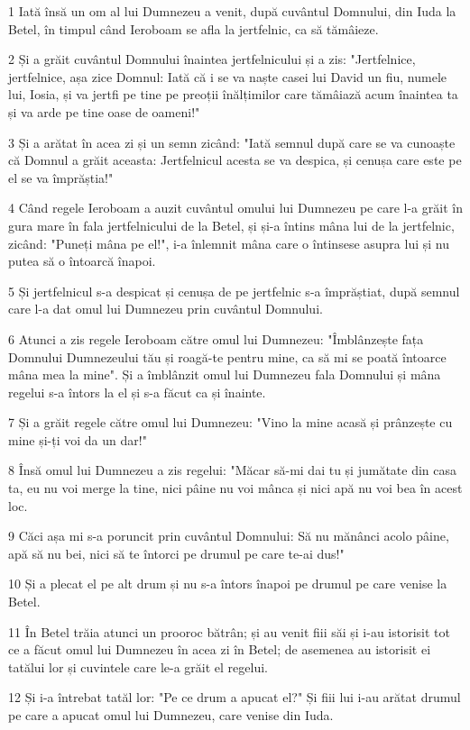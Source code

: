 \par 1 Iată însă un om al lui Dumnezeu a venit, după cuvântul Domnului, din Iuda la Betel, în timpul când Ieroboam se afla la jertfelnic, ca să tămâieze.
\par 2 Și a grăit cuvântul Domnului înaintea jertfelnicului și a zis: "Jertfelnice, jertfelnice, așa zice Domnul: Iată că i se va naște casei lui David un fiu, numele lui, Iosia, și va jertfi pe tine pe preoții înălțimilor care tămâiază acum înaintea ta și va arde pe tine oase de oameni!"
\par 3 Și a arătat în acea zi și un semn zicând: "Iată semnul după care se va cunoaște că Domnul a grăit aceasta: Jertfelnicul acesta se va despica, și cenușa care este pe el se va împrăștia!"
\par 4 Când regele Ieroboam a auzit cuvântul omului lui Dumnezeu pe care l-a grăit în gura mare în fala jertfelnicului de la Betel, și și-a întins mâna lui de la jertfelnic, zicând: "Puneți mâna pe el!", i-a înlemnit mâna care o întinsese asupra lui și nu putea să o întoarcă înapoi.
\par 5 Și jertfelnicul s-a despicat și cenușa de pe jertfelnic s-a împrăștiat, după semnul care l-a dat omul lui Dumnezeu prin cuvântul Domnului.
\par 6 Atunci a zis regele Ieroboam către omul lui Dumnezeu: "Îmblânzește fața Domnului Dumnezeului tău și roagă-te pentru mine, ca să mi se poată întoarce mâna mea la mine". Și a îmblânzit omul lui Dumnezeu fala Domnului și mâna regelui s-a întors la el și s-a făcut ca și înainte.
\par 7 Și a grăit regele către omul lui Dumnezeu: "Vino la mine acasă și prânzește cu mine și-ți voi da un dar!"
\par 8 Însă omul lui Dumnezeu a zis regelui: "Măcar să-mi dai tu și jumătate din casa ta, eu nu voi merge la tine, nici pâine nu voi mânca și nici apă nu voi bea în acest loc.
\par 9 Căci așa mi s-a poruncit prin cuvântul Domnului: Să nu mănânci acolo pâine, apă să nu bei, nici să te întorci pe drumul pe care te-ai dus!"
\par 10 Și a plecat el pe alt drum și nu s-a întors înapoi pe drumul pe care venise la Betel.
\par 11 În Betel trăia atunci un prooroc bătrân; și au venit fiii săi și i-au istorisit tot ce a făcut omul lui Dumnezeu în acea zi în Betel; de asemenea au istorisit ei tatălui lor și cuvintele care le-a grăit el regelui.
\par 12 Și i-a întrebat tatăl lor: "Pe ce drum a apucat el?" Și fiii lui i-au arătat drumul pe care a apucat omul lui Dumnezeu, care venise din Iuda.
